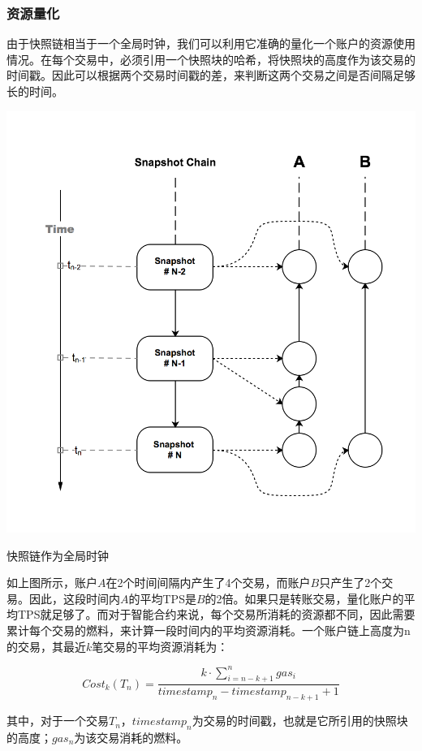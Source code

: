 \documentclass[UTF8,nofonts]{ctexart}
\makeatletter
\newenvironment{figurehere}
 {\def\@captype{figure}}
 {}
\makeatother
\begin{document}
\begin{multicols}{2}
\subsubsection{资源量化}
由于快照链相当于一个全局时钟，我们可以利用它准确的量化一个账户的资源使用情况。在每个交易中，必须引用一个快照块的哈希，将快照块的高度作为该交易的时间戳。因此可以根据两个交易时间戳的差，来判断这两个交易之间是否间隔足够长的时间。

\begin{center}
\begin{figurehere}
\includegraphics[width=.8\linewidth]{image/snapshotchain-clock.png}
\caption{快照链作为全局时钟}
\end{figurehere}
\end{center}

如上图所示，账户$A$在2个时间间隔内产生了4个交易，而账户$B$只产生了2个交易。因此，这段时间内$A$的平均TPS是$B$的2倍。如果只是转账交易，量化账户的平均TPS就足够了。而对于智能合约来说，每个交易所消耗的资源都不同，因此需要累计每个交易的燃料，来计算一段时间内的平均资源消耗。一个账户链上高度为n的交易，其最近$k$笔交易的平均资源消耗为：

\begin{equation}
Cost_{k}(T_n) = \frac{k \cdot \sum_{i=n-k+1}^{n}gas_{i}}{timestamp_{n} - timestamp_{n-k+1} + 1} 
\end{equation}

其中，对于一个交易$T_n$，$timestamp_n$为交易的时间戳，也就是它所引用的快照块的高度；$gas_n$为该交易消耗的燃料。


\end{multicols}
\end{document}
